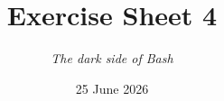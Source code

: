 




\title{{\vspace{-12mm}\huge\textbf{Exercise Sheet 4}}}
\author{\textit{The dark side of Bash}}
\date{{\small 25 June 2026}}


    \maketitle
    \bigskip
    
    \bigskip
    
    \bigskip
    
    \bigskip
    
    \bigskip
    
